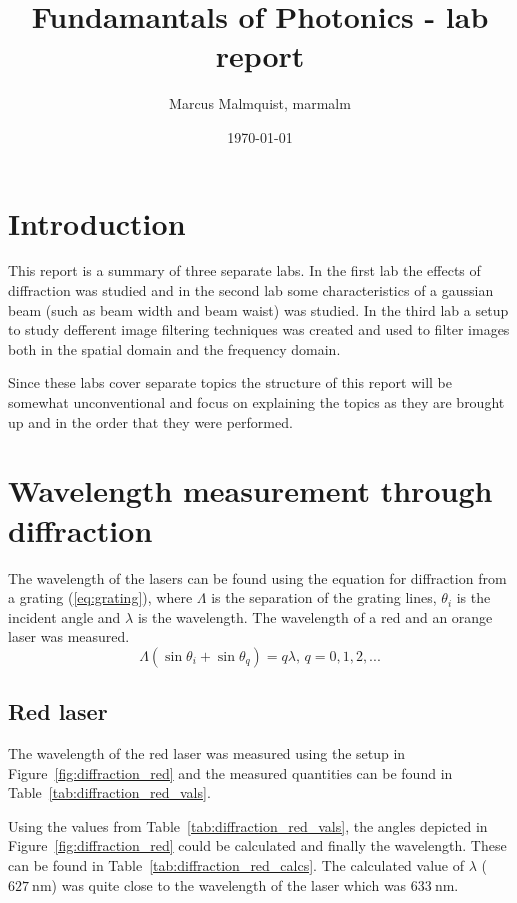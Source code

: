 \documentclass[12pt,a4paper]{article}
\title{Fundamantals of Photonics - lab report}
\author{Marcus Malmquist, marmalm}
\date{\today}
\begin{document}
\maketitle
\newpage
{}
\tableofcontents
\newpage
{}

\section{Introduction}
This report is a summary of three separate labs. In the first lab the effects of diffraction was studied and in the second lab some characteristics of a gaussian beam (such as beam width and beam waist) was studied. In the third lab a setup to study defferent image filtering techniques was created and used to filter images both in the spatial domain and the frequency domain.

Since these labs cover separate topics the structure of this report will be somewhat unconventional and focus on explaining the topics as they are brought up and in the order that they were performed.
\section{Wavelength measurement
  through diffraction}
The wavelength of the lasers can be found using the equation for diffraction from a grating (\ref{eq:grating}), where $\Lambda$ is the separation of the grating lines, $\theta_i$ is the incident angle and $\lambda$ is the wavelength. The wavelength of a red and an orange laser was measured.
\begin{equation}
  \label{eq:grating}
  \Lambda(\sin\theta_i+\sin\theta_q)=q\lambda \text{, }q=0,1,2,...
\end{equation}
\subsection{Red laser}
The wavelength of the red laser was measured using the setup in Figure~\ref{fig:diffraction_red} and the measured quantities can be found in Table~\ref{tab:diffraction_red_vals}.

Using the values from Table~\ref{tab:diffraction_red_vals}, the angles depicted in Figure~\ref{fig:diffraction_red} could be calculated and finally the wavelength. These can be found in Table~\ref{tab:diffraction_red_calcs}. The calculated value of $\lambda$ ($\SI{627}{\nano\metre}$) was quite close to the wavelength of the laser which was $\SI{633}{\nano\metre}$.
\end{document}
